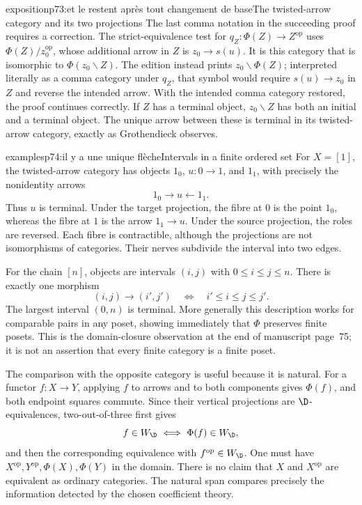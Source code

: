 \begin{dcomment}{exposition}{p73:et le restent après tout changement de base}{The twisted-arrow category and its two projections}
The last comma notation in the succeeding proof requires a correction. The strict-equivalence test for $q_Z:\Phi(Z)\to Z^{\mathrm{op}}$ uses $\Phi(Z)/z_0^{\mathrm{op}}$, whose additional arrow in $Z$ is $z_0\to s(u)$. It is this category that is isomorphic to $\Phi(z_0\backslash Z)$. The edition instead prints $z_0\backslash\Phi(Z)$; interpreted literally as a comma category under $q_Z$, that symbol would require $s(u)\to z_0$ in $Z$ and reverse the intended arrow. With the intended comma category restored, the proof continues correctly. If $Z$ has a terminal object, $z_0\backslash Z$ has both an initial and a terminal object. The unique arrow between these is terminal in its twisted-arrow category, exactly as Grothendieck observes.
\end{dcomment}

\begin{dcomment}{examples}{p74:il y a une unique flèche}{Intervals in a finite ordered set}
For $X=[1]$, the twisted-arrow category has objects $1_0$, $u:0\to1$, and $1_1$, with precisely the nonidentity arrows
\[
 1_0\longrightarrow u\longleftarrow1_1.
\]
Thus $u$ is terminal. Under the target projection, the fibre at $0$ is the point $1_0$, whereas the fibre at $1$ is the arrow $1_1\to u$. Under the source projection, the roles are reversed. Each fibre is contractible, although the projections are not isomorphisms of categories. Their nerves subdivide the interval into two edges.

For the chain $[n]$, objects are intervals $(i,j)$ with $0\leq i\leq j\leq n$. There is exactly one morphism
\[
 (i,j)\longrightarrow(i',j')
 \quad\Longleftrightarrow\quad i'\leq i\leq j\leq j'.
\]
The largest interval $(0,n)$ is terminal. More generally this description works for comparable pairs in any poset, showing immediately that $\Phi$ preserves finite posets. This is the domain-closure observation at the end of manuscript page~75; it is not an assertion that every finite category is a finite poset.

The comparison with the opposite category is useful because it is natural. For a functor $f:X\to Y$, applying $f$ to arrows and to both components gives $\Phi(f)$, and both endpoint squares commute. Since their vertical projections are $\D$-equivalences, two-out-of-three first gives
\[
 f\in W_{\D}\ \Longleftrightarrow\ \Phi(f)\in W_{\D},
\]
and then the corresponding equivalence with $f^{\mathrm{op}}\in W_{\D}$. One must have $X^{\mathrm{op}},Y^{\mathrm{op}},\Phi(X),\Phi(Y)$ in the domain. There is no claim that $X$ and $X^{\mathrm{op}}$ are equivalent as ordinary categories. The natural span compares precisely the information detected by the chosen coefficient theory.
\end{dcomment}

